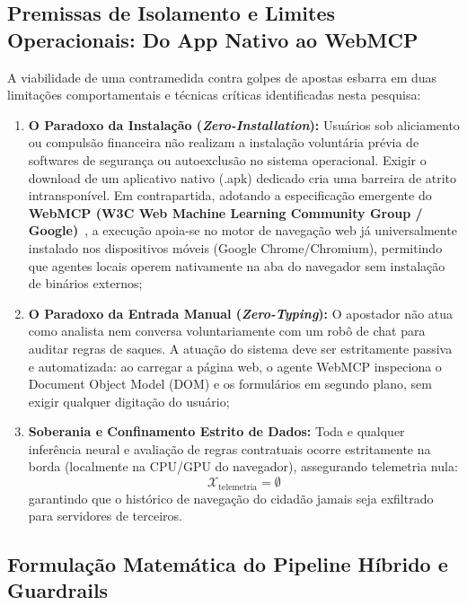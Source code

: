 \subsection{Premissas de Isolamento e Limites Operacionais: Do App Nativo ao WebMCP}

A viabilidade de uma contramedida contra golpes de apostas esbarra em duas limita\c{c}\~{o}es comportamentais e t\'{e}cnicas cr\'{i}ticas identificadas nesta pesquisa:
\begin{enumerate}
    \item \textbf{O Paradoxo da Instala\c{c}\~{a}o (\textit{Zero-Installation}):} Usu\'{a}rios sob aliciamento ou compuls\~{a}o financeira n\~{a}o realizam a instala\c{c}\~{a}o volunt\'{a}ria pr\'{e}via de softwares de seguran\c{c}a ou autoexclus\~{a}o no sistema operacional. Exigir o download de um aplicativo nativo (.apk) dedicado cria uma barreira de atrito intranspon\'{i}vel. Em contrapartida, adotando a especifica\c{c}\~{a}o emergente do \textbf{WebMCP (W3C Web Machine Learning Community Group / Google)}~\cite{w3c2025webmcp}, a execu\c{c}\~{a}o apoia-se no motor de navega\c{c}\~{a}o web j\'{a} universalmente instalado nos dispositivos m\'{o}veis (Google Chrome/Chromium), permitindo que agentes locais operem nativamente na aba do navegador sem instala\c{c}\~{a}o de bin\'{a}rios externos;
    \item \textbf{O Paradoxo da Entrada Manual (\textit{Zero-Typing}):} O apostador n\~{a}o atua como analista nem conversa voluntariamente com um rob\^{o} de chat para auditar regras de saques. A atua\c{c}\~{a}o do sistema deve ser estritamente passiva e automatizada: ao carregar a p\'{a}gina web, o agente WebMCP inspeciona o Document Object Model (DOM) e os formul\'{a}rios em segundo plano, sem exigir qualquer digita\c{c}\~{a}o do usu\'{a}rio;
    \item \textbf{Soberania e Confinamento Estrito de Dados:} Toda e qualquer infer\^{e}ncia neural e avalia\c{c}\~{a}o de regras contratuais ocorre estritamente na borda (localmente na CPU/GPU do navegador), assegurando telemetria nula:
    \begin{equation}
        \mathcal{X}_{\text{telemetria}} = \emptyset
    \end{equation}
    garantindo que o hist\'{o}rico de navega\c{c}\~{a}o do cidad\~{a}o jamais seja exfiltrado para servidores de terceiros.
\end{enumerate}

\subsection{Formula\c{c}\~{a}o Matem\'{a}tica do Pipeline H\'{i}brido e Guardrails}

